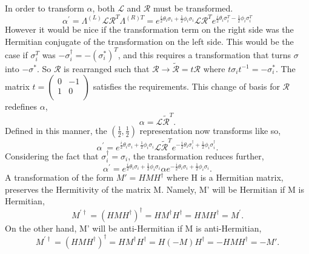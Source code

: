 In order to transform $\alpha$, both $\mathcal{L}$ and $\mathcal{R}$ must be transformed.
\begin{equation}
\alpha^{'} = \Lambda^{(L)} \mathcal{L} \mathcal{R}^T \Lambda^{(R)T} 
 = e^{\frac{i}{2}\theta_i \sigma_i + \frac{1}{2}\phi_i \sigma_i} \mathcal{L} \mathcal{R}^T e^{\frac{i}{2}\theta_i \sigma_i^T - \frac{1}{2}\phi_i \sigma_i^T} 
\end{equation}
However it would be nice if the transformation term on the right side was the Hermitian conjugate of the transformation on the left side. This would be the case if $\sigma_i^T$ was $-\sigma_i^{\dagger} = -(\sigma_i^{*})^{T}$, and this requires a transformation that turns $\sigma$ into $-\sigma^{*}$. So $\mathcal{R}$ is rearranged such that $\mathcal{R} \rightarrow \tilde{\mathcal{R}} = t\mathcal{R}$ where $t\sigma_i t^{-1} = -\sigma_i^{*}$. The matrix $t = \left( \begin{smallmatrix} 0 & -1 \\ 1 & 0 \\ \end{smallmatrix} \right)$ satisfies the requirements. This change of basis for $\mathcal{R}$ redefines $\alpha$,
\begin{equation}
\alpha = \mathcal{L}\tilde{\mathcal{R}}^T.
\end{equation}
Defined in this manner, the $(\frac{1}{2}, \frac{1}{2})$ representation now transforms like so,
\begin{equation}
\alpha^{'} = e^{\frac{i}{2}\theta_i \sigma_i + \frac{1}{2}\phi_i \sigma_i} 
\mathcal{L}\tilde{\mathcal{R}}^T e^{-\frac{i}{2}\theta_i \sigma_i^\dagger + \frac{1}{2}\phi_i \sigma_i^\dagger}.
\end{equation}
Considering the fact that $\sigma_i^\dagger = \sigma_i$, the transformation reduces further,
\begin{equation}
\alpha^{'} = e^{\frac{i}{2}\theta_i \sigma_i + \frac{1}{2}\phi_i \sigma_i} 
\alpha e^{-\frac{i}{2}\theta_i \sigma_i + \frac{1}{2}\phi_i \sigma_i}.
\end{equation}
A transformation of the form $M' = HMH^\dagger$ where H is a Hermitian matrix, preserves the Hermitivity of the matrix M. Namely, M' will be Hermitian if M is Hermitian, 
\begin{equation}
M^{'\dagger} = (HMH^\dagger)^\dagger = HM^\dagger H^\dagger = HMH^\dagger = M^{'}.
\end{equation}
On the other hand, M' will be anti-Hermitian if M is anti-Hermitian,
\begin{equation}
M^{'\dagger} = (HMH^\dagger)^\dagger = HM^\dagger H^\dagger = H(-M)H^\dagger = -HMH^\dagger = -M'.
\end{equation}

